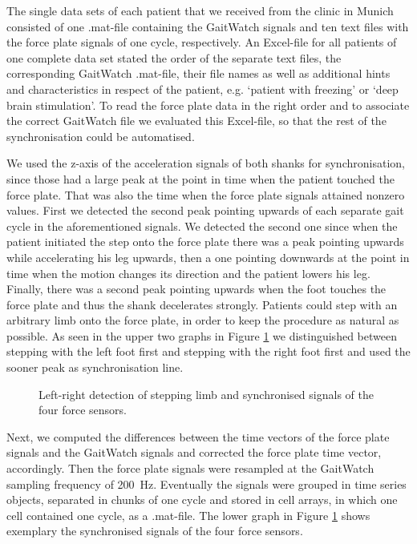 The single data sets of each patient that we received from the clinic in Munich consisted of one .mat-file containing the GaitWatch signals and ten text files with the force plate signals of one cycle, respectively. An Excel-file for all patients of one complete data set stated the order of the separate text files, the corresponding GaitWatch .mat-file, their file names as well as additional hints and characteristics in respect of the patient, e.g. `patient with freezing' or `deep brain stimulation'. To read the force plate data in the right order and to associate the correct GaitWatch file we evaluated this Excel-file, so that the rest of the synchronisation could be automatised.

We used the z-axis of the acceleration signals of both shanks for synchronisation, since those had a large peak at the point in time when the patient touched the force plate. That was also the time when the force plate signals attained nonzero values.  First we detected the second peak pointing upwards of each separate gait cycle in the aforementioned signals. We detected the second one since when the patient initiated the step onto the force plate there was a peak pointing upwards while accelerating his leg upwards, then a one pointing downwards at the point in time when the motion changes its direction and the patient lowers his leg. Finally, there was a second peak pointing upwards when the foot touches the force plate and thus the shank decelerates strongly. Patients could step with an arbitrary limb onto the force plate, in order to keep the procedure as natural as possible. As seen in the upper two graphs in Figure \ref{fig:left_right_detect} we distinguished between stepping with the left foot first and stepping with the right foot first and used the sooner peak as synchronisation line. 

\begin{figure}
	\centering
	\caption{Left-right detection of stepping limb and synchronised signals of the four force sensors.}
	\label{fig:left_right_detect}
\end{figure}

  Next, we computed the differences between the time vectors of the force plate signals and the GaitWatch signals and corrected the force plate time vector, accordingly. Then the force plate signals were resampled at the GaitWatch sampling frequency of \mbox{200 Hz}. Eventually the signals were grouped in time series objects, separated in chunks of one cycle and stored in cell arrays, in which one cell contained one cycle, as a .mat-file. The lower graph in Figure \ref{fig:left_right_detect} shows exemplary the synchronised signals of the four force sensors. 

